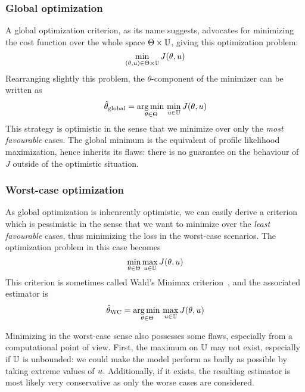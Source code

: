 \documentclass[../../Main_ManuscritThese.tex]{subfiles}
\begin{document}
\subsubsection{Global optimization}
A global optimization criterion, as its name suggests, advocates for minimizing the cost function over the whole space $\Theta \times \mathbb{U}$, giving this optimization problem:
\begin{equation}
  \min_{(\theta,u) \in \Theta \times \mathbb{U}} J(\theta, u)
\end{equation}
Rearranging slightly this problem, the $\theta$-component of the minimizer can be written as
\begin{equation}
  \label{eq:kkglobal}
  \hat{\theta}_{\mathrm{global}} = \operatorname*{arg\,min \,}_{\theta \in \Theta} \min_{u \in \mathbb{U}} J(\theta, u)
\end{equation}
 This strategy is optimistic in the sense that we minimize over only the \emph{most favourable} cases. 
The global minimum is the equivalent of profile likelihood maximization, hence inherits its flaws: there is no guarantee on the behaviour of $J$ outside of the optimistic situation.

\subsubsection{Worst-case optimization}
\label{sec:saddle_point}
As global optimization is inhenrently optimistic, we can easily derive a criterion which is pessimistic in the sense that we want to minimize over the \emph{least favourable} cases, thus minimizing the loss in the worst-case scenarios. The optimization problem in this case becomes
\begin{equation}
  \min_{\theta\in\Theta} \max_{u \in \mathbb{U}} J(\theta,u)
\end{equation}
This criterion is sometimes called Wald's Minimax criterion~\cite{wald_statistical_1945}, and the associated estimator is
\begin{equation}
  \label{eq:kkwc}
  \hat{\theta}_{\mathrm{WC}} =  \operatorname*{arg\,min \,}_{\theta \in \Theta} \max_{u \in \mathbb{U}} J(\theta, u)
\end{equation}

Minimizing in the worst-case sense also possesses some flaws, especially from a computational point of view.
First, the maximum on $\mathbb{U}$ may not exist, especially if $\mathbb{U}$ is unbounded: we could make the model perform as badly as possible by taking extreme values of $u$. 
Additionally, if it exists, the resulting estimator is most likely very conservative as only the worse cases are considered.
\end{document}
